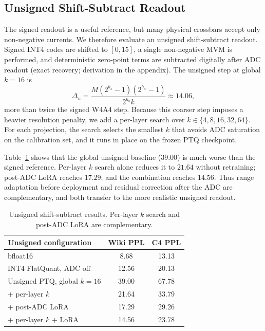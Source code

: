 \documentclass[letterpaper]{article} %
\theoremstyle{plain}
\begin{document}
\subsection{Unsigned Shift-Subtract Readout}

The signed readout is a useful reference, but many physical crossbars accept only non-negative currents. We therefore evaluate an unsigned shift-subtract readout. Signed INT4 codes are shifted to $[0,15]$, a single non-negative MVM is performed, and deterministic zero-point terms are subtracted digitally after ADC readout (exact recovery; derivation in the appendix). The unsigned step at global $k = 16$ is
\begin{equation}
    \Delta_u = \frac{M(2^{b_x}-1)(2^{b_w}-1)}{2^{b_a}k} \approx 14.06,
    \label{eq:delta_u}
\end{equation}
more than twice the signed W4A4 step. Because this coarser step imposes a heavier resolution penalty, we add a per-layer search over $k \in \{4,8,16,32,64\}$. For each projection, the search selects the smallest $k$ that avoids ADC saturation on the calibration set, and it runs in place on the frozen PTQ checkpoint.

Table~\ref{tab:unsigned} shows that the global unsigned baseline ($39.00$) is much worse than the signed reference. Per-layer $k$ search alone reduces it to $21.64$ without retraining; post-ADC LoRA reaches $17.29$; and the combination reaches $14.56$. Thus range adaptation before deployment and residual correction after the ADC are complementary, and both transfer to the more realistic unsigned readout.

\begin{table}[t]
\centering
\setlength{\tabcolsep}{4pt}
\begin{tabular}{@{}l|cc@{}}
\toprule
Unsigned configuration & Wiki PPL & C4 PPL \\
\midrule
bfloat16 & 8.68 & 13.13 \\
INT4 FlatQuant, ADC off & 12.56 & 20.13 \\
Unsigned PTQ, global $k=16$ & 39.00 & 67.78 \\
\quad + per-layer $k$ & 21.64 & 33.79 \\
\quad + post-ADC LoRA & 17.29 & 29.26 \\
\quad + per-layer $k$ + LoRA & 14.56 & 23.78 \\
\bottomrule
\end{tabular}
\caption{Unsigned shift-subtract results. Per-layer $k$ search and post-ADC LoRA are complementary.}
\label{tab:unsigned}
\end{table}
\end{document}
